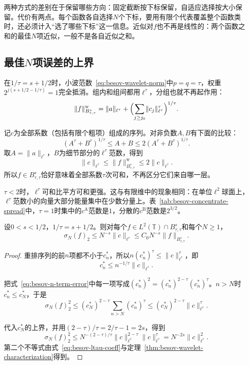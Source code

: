 两种方式的差别在于保留哪些方向：固定截断按下标保留，自适应选择按大小保留。代价有两点。每个函数各自选择$N$个下标，要用有限个代表覆盖整个函数类时，还必须计入“选了哪些下标”这一信息。近似对$f$也不再是线性的：两个函数之和的最佳$N$项近似，一般不是各自近似之和。

\subsection{最佳\texorpdfstring{$N$}{N}项误差的上界}
\label{sec:besov-n-term-upper}

在$1/\tau=s+1/2$时，小波范数~\eqref{eq:besov-wavelet-norm}中$p=q=\tau$，权重$2^{j(s+1/2-1/\tau)}=1$完全抵消。组内和组间都用$\ell^\tau$，分组也就不再起作用：
\[
 \lVert f\rVert_{B^s_{\tau,\tau}}^{\mathrm w}=\lVert a\rVert_{\ell^\tau}+\Bigl(\sum_{j\geq j_0}\lVert c_j\rVert_{\ell^\tau}^\tau\Bigr)^{1/\tau}.
\]

记$c$为全部系数（包括有限个粗项）组成的序列。对非负数$A,B$有下面的比较：
\[
 (A^\tau+B^\tau)^{1/\tau}\leq A+B\leq2(A^\tau+B^\tau)^{1/\tau} .
\]
取$A=\lVert a\rVert_{\ell^\tau}$，$B$为细节部分的$\ell^\tau$范数，得到
\begin{equation}
 \lVert c\rVert_{\ell^\tau}\leq\lVert f\rVert^{\mathrm w}_{B^s_{\tau,\tau}}\leq2\lVert c\rVert_{\ell^\tau}.
 \label{eq:besov-ltau-coeff}
\end{equation}
所以$f\in B^s_{\tau,\tau}$恰好意味着全部系数$\tau$次可和，不再区分它们来自哪一层。

$\tau<2$时，$\ell^\tau$可和比平方可和更强。这与有限维中的现象相同：在单位$\ell^2$球面上，$\ell^\tau$范数小的向量大部分能量集中在少数分量上。表~\ref{tab:besov-concentrate-spread}中，$\tau=1$时集中的$c^{\mathrm A}$范数是$1$，分散的$c^{\mathrm B}$范数是$2^{3/2}$。

\begin{theorem}[最佳$N$项误差的上界]
\label{thm:besov-n-term-upper}
设$0<s<1/2$，$1/\tau=s+1/2$。则对每个$f\in L^2(\mathbb T)\cap B^s_{\tau,\tau}$和每个$N\geq1$，
\begin{equation}
 \sigma_N(f)_2\leq N^{-s}\lVert c\rVert_{\ell^\tau}\leq C_0N^{-s}\lVert f\rVert_{B^s_{\tau,\tau}} .
 \label{eq:besov-n-term-upper}
\end{equation}
\end{theorem}

\begin{proof}
重排序列的前$n$项都不小于$c_n^*$，所以$n(c_n^*)^\tau\leq\lVert c\rVert_{\ell^\tau}^\tau$，即
\[
 c_n^*\leq n^{-1/\tau}\lVert c\rVert_{\ell^\tau} .
\]

把式~\eqref{eq:besov-n-term-error}中每一项写成$(c_n^*)^2=(c_n^*)^{2-\tau}(c_n^*)^\tau$。$n>N$时$c_n^*\leq c_N^*$，于是
\[
 \sigma_N(f)_2^2\leq(c_N^*)^{2-\tau}\sum_{n>N}(c_n^*)^\tau\leq(c_N^*)^{2-\tau}\lVert c\rVert_{\ell^\tau}^\tau .
\]

代入$c_N^*$的上界，并用$(2-\tau)/\tau=2/\tau-1=2s$，得到
\[
 \sigma_N(f)_2^2\leq N^{-(2-\tau)/\tau}\lVert c\rVert_{\ell^\tau}^{2-\tau}\lVert c\rVert_{\ell^\tau}^\tau=N^{-2s}\lVert c\rVert_{\ell^\tau}^2 .
\]
第二个不等式由式~\eqref{eq:besov-ltau-coeff}与定理~\ref{thm:besov-wavelet-characterization}得到。
\end{proof}

